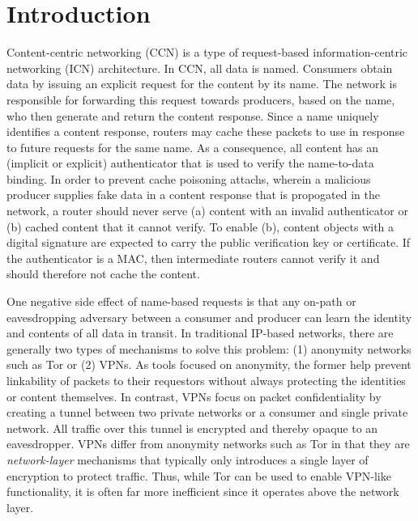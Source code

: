 \section{Introduction}
Content-centric networking (CCN) is a type of request-based information-centric
networking (ICN) architecture. In CCN, all data is named. Consumers obtain data
by issuing an explicit request for the content by its name. The network is
responsible for forwarding this request towards producers, based on the name,
who then generate and return the content response. Since a name uniquely identifies
a content response, routers may cache these packets to use in response to
future requests for the same name. As a consequence, all content has an (implicit
or explicit) authenticator that is used to verify the name-to-data binding. In
order to prevent cache poisoning attachs, wherein a malicious producer supplies
fake data in a content response that is propogated in the network, a router
should never serve (a) content with an invalid authenticator or (b) cached
content that it cannot verify. To enable (b), content objects with a digital
signature are expected to carry the public verification key or certificate. If the
authenticator is a MAC, then intermediate routers cannot verify it and should
therefore not cache the content.

One negative side effect of name-based requests is that any on-path or
eavesdropping adversary between a consumer and producer can learn the identity
and contents of all data in transit. In traditional IP-based networks, there are
generally two types of mechanisms to solve this problem: (1) anonymity
networks such as Tor \cite{dingledine2004tor} or (2) VPNs. As tools focused on anonymity,
the former help prevent linkability of packets to their requestors without
always protecting the identities or content themselves. In contrast, VPNs focus
on packet confidentiality by creating a tunnel between two private networks
or a consumer and single private network. All traffic over this tunnel is
encrypted and thereby opaque to an eavesdropper. VPNs differ from anonymity
networks such as Tor in that they are \emph{network-layer} mechanisms that
typically only introduces a single layer of encryption to protect traffic.
Thus, while Tor can be used to enable VPN-like functionality, it is often
far more inefficient since it operates above the network layer.

